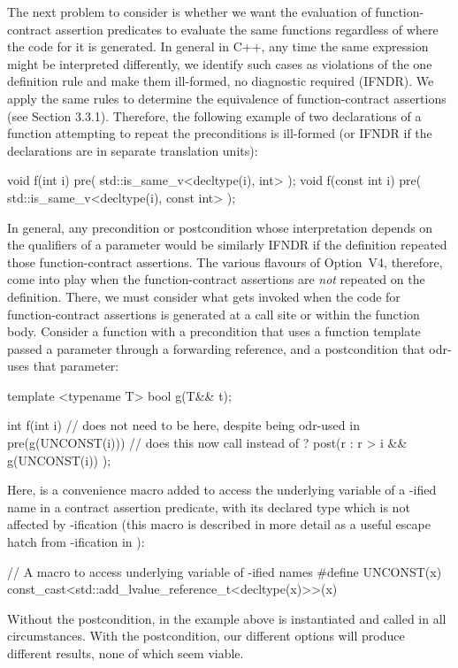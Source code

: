 The next problem to consider is whether we want the evaluation of function-contract assertion predicates to evaluate the same functions regardless of where the code for it is generated.  In general in C++, any time the same expression might be interpreted differently, we identify such cases as violations of the one definition rule and make them ill-formed, no diagnostic required (IFNDR). We apply the same rules to determine the equivalence of function-contract assertions (see \cite{P2900R10} Section 3.3.1). Therefore, the following example of two declarations of a function attempting to repeat the preconditions is ill-formed (or IFNDR if the declarations are in separate translation units):
\begin{codeblock}
void f(int i) pre( std::is_same_v<decltype(i), int> );
void f(const int i) pre( std::is_same_v<decltype(i), const int> );
\end{codeblock}
In general, any precondition or postcondition whose interpretation depends on the  qualifiers of a parameter would be similarly IFNDR if the definition repeated those function-contract assertions.  The various flavours of Option~V4, therefore, come into play when the function-contract assertions are \emph{not} repeated on the definition. There, we must consider what gets invoked when the code for function-contract assertions is generated at a call site or within the function body.  Consider a function with a precondition that uses a function template passed a parameter through a forwarding reference, and a postcondition that odr-uses that parameter:
\begin{codeblock}
template <typename T>
bool g(T&& t);

int f(int i)  //  does not need to be  here, despite being odr-used in 
  pre(g(UNCONST(i)))   // does this now call  instead of ?
  post(r : r > i && g(UNCONST(i)) );
\end{codeblock}
Here,  is a convenience macro added to access the underlying variable of a -ified name in a contract assertion predicate, with its declared type which is not affected by -ification (this macro is described in more detail as a useful escape hatch from -ification in \cite{P3261R1}):
\begin{codeblock}
// A macro to access underlying variable of -ified names
#define UNCONST(x) const_cast<std::add_lvalue_reference_t<decltype(x)>>(x)
\end{codeblock}
Without the postcondition,  in the example above is instantiated and called in all circumstances.  With the postcondition, our different options will produce different results, none of which seem viable.

